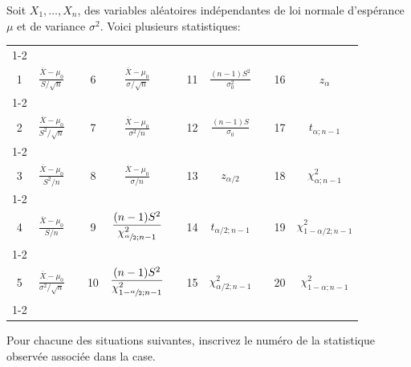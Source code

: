 \begin{questions}
\vspace{1cm}


\question 
Soit $X_1,\hdots, X_{n}$, des variables aléatoires indépendantes de loi normale d'espérance $\mu$ et de variance $\sigma^2$. Voici plusieurs statistiques:
\begin{center}
    
\begin{tabular}{|c|c|c|c|c|c|c|c|c|c|c|}
\cline{1-2}\cline{4-5}\cline{7-8}\cline{10-11}&&&&&&&&&&\\[-3mm]

1 
& $\displaystyle \frac{\overline{X}-\mu_0}{S/\sqrt{n}}$
&
& 6 
& $\displaystyle \frac{\overline{X}-\mu_0}{\sigma/\sqrt{n}}$
&
&11
& $\displaystyle \frac{ (n-1)S^2}{ \sigma_0^2}$
&
&16
& $z_{\alpha}$
\\[4mm]

\cline{1-2}\cline{4-5}\cline{7-8}\cline{10-11}&&&&&&&&&&\\[-3mm]
2 
& $\displaystyle \frac{\overline{X}-\mu_0}{S^2/\sqrt{n}}$
&  
& 7 
& $\displaystyle \frac{\overline{X}-\mu_0}{\sigma^2/n}$
&
&12
& $\displaystyle  \frac{ (n-1)S}{\sigma_0}$
&
&17
& $t_{\alpha;n-1}$
\\[4mm]
\cline{1-2}\cline{4-5}\cline{7-8}\cline{10-11}&&&&&&&&&&\\[-3mm]
3 
& $\displaystyle \frac{\overline{X}-\mu_0}{S^2/n}$
&  
& 8 
& $\displaystyle \frac{\overline{X}-\mu_0}{\sigma/n}$
&
&13
& $z_{\alpha/2}$
&
&18
& $\chi^2_{\alpha;n-1}$
\\[4mm]
\cline{1-2}\cline{4-5}\cline{7-8}\cline{10-11}&&&&&&&&&&\\[-3mm]
4 
& $\displaystyle \frac{\overline{X}-\mu_0}{S/n}$
&  
& 9 
& $\displaystyle\frac{ (n-1)S^2}{ \chi_{\sfrac{\alpha}{2};n-1}^2}$
&
&14
& $t_{\alpha/2;n-1}$
&
&19
& $\chi^2_{1-\alpha/2;n-1}$
\\[4mm]
\cline{1-2}\cline{4-5}\cline{7-8}\cline{10-11}&&&&&&&&&&\\[-3mm]
5 
& $\displaystyle \frac{\overline{X}-\mu_0}{\sigma^2/\sqrt{n}}$
&  
& 10 
& $\displaystyle\frac{ (n-1)S^2}{ \chi_{1-\sfrac{\alpha}{2};n-1}^2}$
&
&15
& $\chi^2_{\alpha/2;n-1}$
&
&20
& $\chi^2_{1-\alpha;n-1}$
\\[4mm]
\cline{1-2}\cline{4-5}\cline{7-8}\cline{10-11}
\end{tabular}


\end{center}

Pour chacune des situations suivantes, inscrivez le numéro de la statistique observée associée dans la case.


\end{questions}
